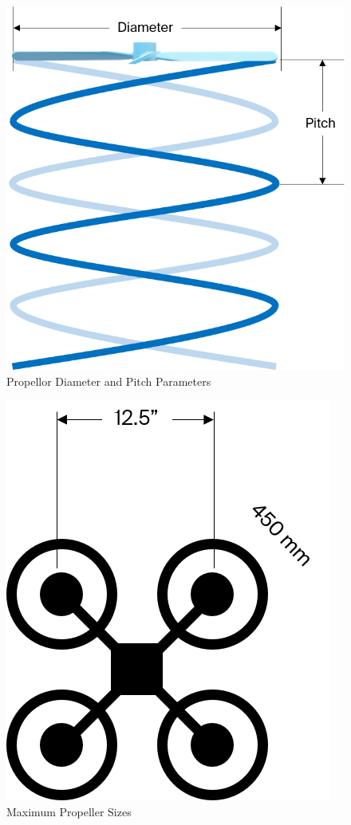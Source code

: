 \begin{figure}[h]
    \centering
    \includegraphics[scale=0.5]{img/proppitch}
    \caption{Propellor Diameter and Pitch Parameters}
    \label{fig:propeller}
\end{figure}

\begin{figure}[h]
    \centering
    \includegraphics[scale=0.5]{img/framepropsize}
    \caption{Maximum Propeller Sizes}
    \label{fig:framepropsize}
\end{figure}

